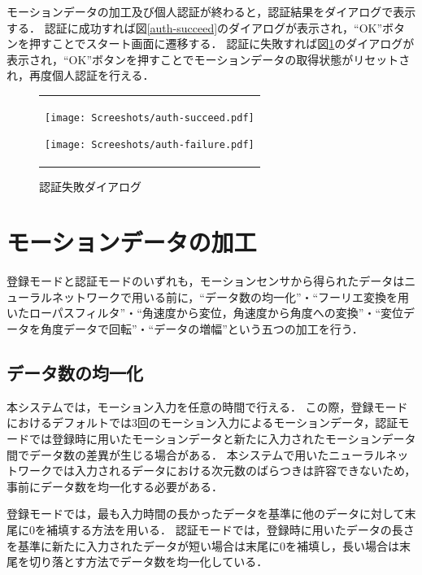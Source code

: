 モーションデータの加工及び個人認証が終わると，認証結果をダイアログで表示する．
認証に成功すれば図\ref{auth-succeed}のダイアログが表示され，``OK''ボタンを押すことでスタート画面に遷移する．
認証に失敗すれば図\ref{auth-failure}のダイアログが表示され，``OK''ボタンを押すことでモーションデータの取得状態がリセットされ，再度個人認証を行える．

\begin{figure}[hbtp]
  \centering
  \begin{tabular}{c}
    \begin{minipage}{0.5\hsize}
      \centering
      \texttt{[image: Screeshots/auth-succeed.pdf]}
      \caption{認証成功ダイアログ}
      \label{auth-succeed}
    \end{minipage}
    \begin{minipage}{0.5\hsize}
      \centering
      \texttt{[image: Screeshots/auth-failure.pdf]}
      \caption{認証失敗ダイアログ}
      \label{auth-failure}
    \end{minipage}
  \end{tabular}
\end{figure}

\section{モーションデータの加工}
登録モードと認証モードのいずれも，モーションセンサから得られたデータはニューラルネットワークで用いる前に，``データ数の均一化''・``フーリエ変換を用いたローパスフィルタ''・``角速度から変位，角速度から角度への変換''・``変位データを角度データで回転''・``データの増幅''という五つの加工を行う．

\subsection{データ数の均一化}
本システムでは，モーション入力を任意の時間で行える．
この際，登録モードにおけるデフォルトでは3回のモーション入力によるモーションデータ，認証モードでは登録時に用いたモーションデータと新たに入力されたモーションデータ間でデータ数の差異が生じる場合がある．
本システムで用いたニューラルネットワークでは入力されるデータにおける次元数のばらつきは許容できないため，事前にデータ数を均一化する必要がある．

登録モードでは，最も入力時間の長かったデータを基準に他のデータに対して末尾に0を補填する方法を用いる．
認証モードでは，登録時に用いたデータの長さを基準に新たに入力されたデータが短い場合は末尾に0を補填し，長い場合は末尾を切り落とす方法でデータ数を均一化している．

